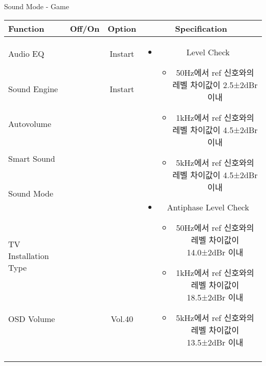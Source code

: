 \begin{frame}[t]{Sound Mode - Game}
\begin{tiny}
\begin{tabular}{@{}lccc@{}}
\toprule
Function & Off/On & Option & Specification \\
\midrule
Audio EQ & \color{black}{Off} & Instart &
\multirow{10}{60mm}{
\begin{itemize}
\item Level Check
  \begin{itemize}
  \item 50Hz에서 ref 신호와의 레벨 차이값이 2.5±2dBr 이내
  \item 1kHz에서 ref 신호와의 레벨 차이값이 4.5±2dBr 이내
  \item 5kHz에서 ref 신호와의 레벨 차이값이 4.5±2dBr 이내
  \end{itemize}
\item Antiphase Level Check
  \begin{itemize}
  \item 50Hz에서 ref 신호와의 레벨 차이값이 14.0±2dBr 이내
  \item 1kHz에서 ref 신호와의 레벨 차이값이 18.5±2dBr 이내
  \item 5kHz에서 ref 신호와의 레벨 차이값이 13.5±2dBr 이내
  \end{itemize}
\end{itemize}
} \\
Sound Engine & \color{blue}{On} & Instart & \\
Autovolume & \color{black}{Off} & & \\
Smart Sound & \color{black}{Off} & & \\
Sound Mode & \color{blue}{On} & \color{blue}{Game} & \\
TV Installation Type & \color{blue}{On} & \color{black}{Standtype1} & \\
OSD Volume & \color{blue}{On} & Vol.40 & \\
& & & \\
& & & \\
& & & \\
& & & \\
\midrule
\end{tabular}
\end{tiny}

\end{frame}